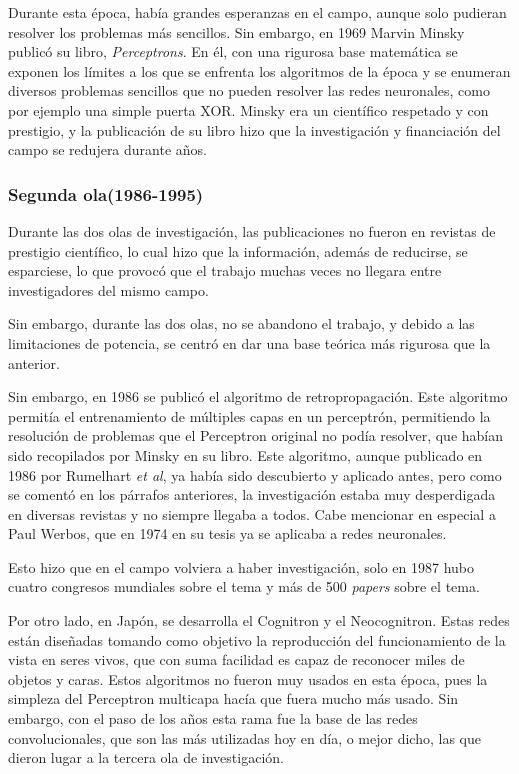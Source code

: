 \documentclass[12pt]{article}
\numberwithin{equation}{section}
\begin{document}
Durante esta época, había grandes esperanzas en el campo, aunque solo pudieran resolver los problemas más sencillos. Sin embargo, en 1969 Marvin Minsky publicó su libro, \textit{Perceptrons}\cite{minsky}. En él, con una rigurosa base matemática se exponen los límites a los que se enfrenta los algoritmos de la época y se enumeran diversos problemas sencillos que no pueden resolver las redes neuronales, como por ejemplo una simple puerta XOR. Minsky era un científico respetado y con prestigio, y la publicación de su libro hizo que la investigación y financiación del campo se redujera durante años.
\subsubsection{Segunda ola(1986-1995)}
Durante las dos olas de investigación, las publicaciones no fueron en revistas de prestigio científico, lo cual hizo que la información, además de reducirse, se esparciese, lo que provocó que el trabajo muchas veces no llegara entre investigadores del mismo campo.

Sin embargo, durante las dos olas, no se abandono el trabajo, y debido a las limitaciones de potencia, se centró en dar una base teórica más rigurosa que la anterior.

Sin embargo, en 1986 se publicó el algoritmo de retropropagación\cite{Rumelhart:1988:LRB:65669.104451}. Este algoritmo permitía el entrenamiento de múltiples capas en un perceptrón, permitiendo la resolución de problemas que el Perceptron original no podía resolver, que habían sido recopilados por Minsky en su libro. Este algoritmo, aunque publicado en 1986 por Rumelhart \textit{et al}, ya había sido descubierto y aplicado antes, pero como se comentó en los párrafos anteriores, la investigación estaba muy desperdigada en diversas revistas y no siempre llegaba a todos. Cabe mencionar en especial a Paul Werbos, que en 1974 en su tesis ya se aplicaba a redes neuronales\cite{werbos}. 

Esto hizo que en el campo volviera a haber investigación, solo en 1987 hubo cuatro congresos mundiales sobre el tema y más de 500 \textit{papers} sobre el tema.

Por otro lado, en Japón, se desarrolla el Cognitron y el Neocognitron. Estas redes están diseñadas tomando como objetivo la reproducción del funcionamiento de la vista en seres vivos, que con suma facilidad es capaz de reconocer miles de objetos y caras. Estos algoritmos no fueron muy usados en esta época, pues la simpleza del Perceptron multicapa hacía que fuera mucho más usado. Sin embargo, con el paso de los años esta rama fue la base de las redes convolucionales, que son las más utilizadas hoy en día, o mejor dicho, las que dieron lugar a la tercera ola de investigación.
\end{document}
